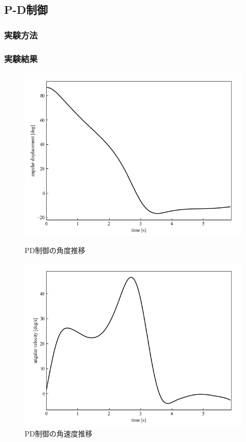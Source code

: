 \newpage

\subsection{P-D制御}
\subsubsection{実験方法}
\subsubsection{実験結果}

\begin{figure}[h]
	\centering
	\begin{minipage}{0.43\columnwidth}
	  \centering
	  \includegraphics[width=\columnwidth]{./figure/PDdeg.png}
	  \caption{PD制御の角度推移}
	  \label{fig:PDdeg}
	\end{minipage}
	\hspace{5mm}
	\begin{minipage}{0.43\columnwidth}
	  \centering
	  \includegraphics[width=\columnwidth]{./figure/PDdegpers.png}
	  \caption{PD制御の角速度推移}
	  \label{fig:PDdegpers}
	\end{minipage}
  \end{figure}

